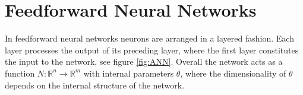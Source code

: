 
\section{Feedforward Neural Networks}
\label{sec:feedworwardNetworks}
In feedforward neural networks neurons are arranged in a layered fashion. Each layer processes the output of its preceding layer, where the first layer constitutes the input to the network, see figure \ref{fig:ANN}. Overall the network acts as a function $N: \mathbb{R}^n \rightarrow \mathbb{R}^m$ with internal parameters $\theta$, where the dimensionality of $\theta$ depends on the internal structure of the network.\\

